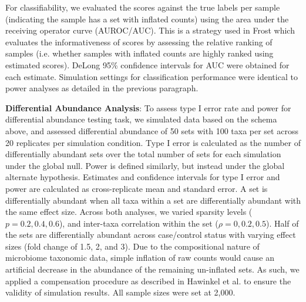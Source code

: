 \documentclass[10pt,letterpaper]{article}
\begin{document}
For classifiability, we evaluated the scores against the true labels per sample (indicating the sample has a set with inflated counts) using the area under the receiving operator curve (AUROC/AUC). This is a strategy used in Frost \cite{frost2020a} which evaluates the informativeness of scores by assessing the relative ranking of samples (i.e. whether samples with inflated counts are highly ranked using estimated scores).  DeLong 95\% confidence intervals for AUC \cite{delong1988} were obtained for each estimate. Simulation settings for classification performance were identical to power analyses as detailed in the previous paragraph. 

\noindent \textbf{Differential Abundance Analysis}: To assess type I error rate and power for differential abundance testing task, we simulated data based on the schema above, and assessed differential abundance of 50 sets with 100 taxa per set across 20 replicates per simulation condition. Type I error is calculated as the number of differentially abundant sets over the total number of sets for each simulation under the global null. Power is defined similarly, but instead under the global alternate hypothesis. Estimates and confidence intervals for type I error and power are calculated as cross-replicate mean and standard error. A set is differentially abundant when all taxa within a set are differentially abundant with the same effect size. Across both analyses, we varied sparsity levels ($p = 0.2, 0.4, 0.6$), and inter-taxa correlation within the set ($\rho = 0, 0.2, 0.5$). Half of the sets are differentially abundant across case/control status with varying effect sizes (fold change of 1.5, 2, and 3). Due to the compositional nature of microbiome taxonomic data, simple inflation of raw counts would cause an artificial decrease in the abundance of the remaining un-inflated sets. As such, we applied a compensation procedure as described in Hawinkel et al. \cite{hawinkel2019} to ensure the validity of simulation results. All sample sizes were set at 2,000.    
\end{document}
